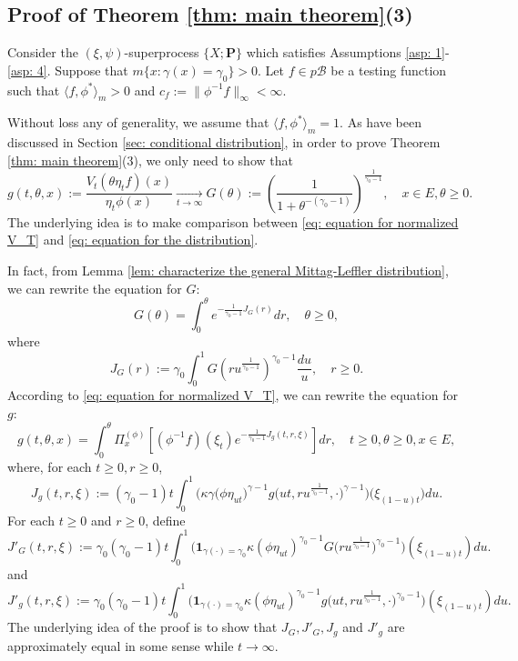 \documentclass[12pt, a4paper]{amsart}
\theoremstyle{definition}
\numberwithin{equation}{section}
\begin{document}
\subsection{Proof of Theorem \ref{thm: main theorem}(3)}
\label{sec: proof of result 3}
	Consider the $(\xi, \psi)$-superprocess $\{X;\mathbf P\}$ which satisfies %
	Assumptions \ref{asp: 1}-\ref{asp: 4}.
	Suppose that $m\{ x:\gamma(x)=\gamma_0 \}>0$.
	Let $f \in p\mathscr B$ be a testing function such that $ \langle f, \phi^* \rangle_m > 0$  and $c_f:=\| \phi^{-1}f \|_\infty < \infty$.
	
	Without loss any of generality, we assume that $\langle f, \phi^* \rangle_m = 1$.
	As have been discussed in Section \ref{sec: conditional distribution}, 
	in order to prove Theorem \ref{thm: main theorem}(3), we only need to show that
\[
	g(t,\theta,x)
	:=\frac{V_t (\theta \eta_t f) (x)}{\eta_t \phi(x)}
	\xrightarrow[t\to \infty]{} G(\theta)
	:= ( \frac{1}{1+\theta^{-(\gamma_0 - 1)}} )^{ \frac{1}{\gamma_0 - 1} },
	\quad x\in E, \theta \geq 0.
\]
	The underlying idea is to make comparison between \eqref{eq: equation for normalized V_T} and \eqref{eq: equation for the distribution}.
	
	In fact, from Lemma \ref{lem: characterize the general Mittag-Leffler distribution}, we can rewrite the equation for $G$:
\[\label{eq: equation for G}
	G(\theta)
	= \int_0^\theta e^{ - \frac{1} {\gamma_0 - 1} J_G(r)} dr,
	\quad \theta \geq 0,
\]
	where
\[\label{eq: definition for J_G}
	J_G(r):=
	\gamma_0 \int_0^1 G(ru^{\frac{1}{\gamma_0 - 1}}) ^{\gamma_0 - 1}\frac{du}{u},
	\quad r\geq 0 .
\]
	According to \eqref{eq: equation for normalized V_T}, we can rewrite the equation for $g$:
\[\label{eq: equation for g}
	g(t,\theta, x)= \int_0^{\theta} \Pi_x^{(\phi)} [ (\phi^{-1}f)(\xi_t) e^{-\frac{1}{\gamma_0 - 1} J_g(t,r,\xi) } ] dr,
	\quad t\geq 0, \theta \geq 0, x\in E,
\]
	where, for each $t\geq 0, r\geq 0$,
\[\label{eq: definition for J_g}
	J_g(t,r,\xi):=
	(\gamma_0 - 1)t\int_0^1 \Big(  \kappa\gamma \big(   \phi \eta_{ut}   \big)^{\gamma - 1} g \big(ut,ru^{\frac{1}{\gamma_0 - 1}},\cdot \big)^{\gamma-1}  \Big) \big(  \xi_{(1-u)t}  \big) du.
\]
	For each $t\geq 0$ and $r\geq 0$, define
\[\label{eq: definition of J'_G}
	J'_G(t,r,\xi):=
	\gamma_0 (\gamma_0 - 1) t \int_0^1 \Big( \mathbf 1_{\gamma(\cdot) = \gamma_0} \kappa (\phi \eta_{ut})^{\gamma_0 - 1} G\big( ru^{\frac{1}{\gamma_0 - 1}} \big) ^{\gamma_0 - 1} \Big) (\xi_{(1-u)t}) du.
\]
	and
\[\label{eq: definition of J'_g}
	J'_g(t,r,\xi):=
	\gamma_0 (\gamma_0 - 1) t \int_0^1 \Big( \mathbf 1_{\gamma(\cdot) = \gamma_0} \kappa (\phi \eta_{ut})^{\gamma_0 - 1} g\big( ut,ru^{\frac{1}{\gamma_0 - 1}}, \cdot \big)^{\gamma_0 - 1}  \Big) (\xi_{(1-u)t})  du.
\]
	The underlying idea of the proof is to show that $J_G,J'_G,J_g$ and $J'_g$ are approximately equal in some sense while $t\to \infty$.
	
\end{document}
